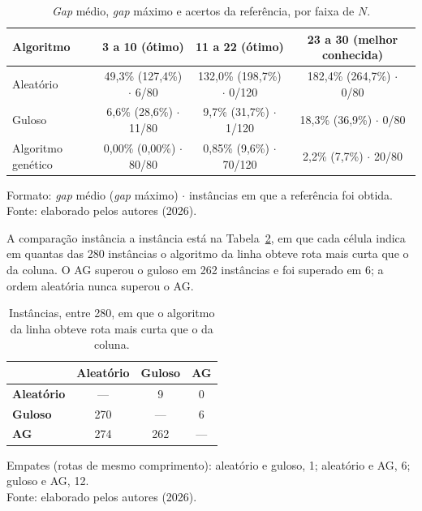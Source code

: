 \begin{table}[H]
    \centering
    \caption{\textit{Gap} médio, \textit{gap} máximo e acertos da referência, por faixa de $N$.}
    \label{tab:rotas_gap}
    \small
    \renewcommand{\arraystretch}{1.25}
    \setlength{\tabcolsep}{4pt}
    \begin{tabular}{lccc}
        \hline
        \textbf{Algoritmo} & \textbf{3 a 10 (ótimo)} & \textbf{11 a 22 (ótimo)} & \textbf{23 a 30 (melhor conhecida)} \\
        \hline
        Aleatório & 49,3\% (127,4\%) $\cdot$ 6/80 & 132,0\% (198,7\%) $\cdot$ 0/120 & 182,4\% (264,7\%) $\cdot$ 0/80 \\
        Guloso & 6,6\% (28,6\%) $\cdot$ 11/80 & 9,7\% (31,7\%) $\cdot$ 1/120 & 18,3\% (36,9\%) $\cdot$ 0/80 \\
        Algoritmo genético & 0,00\% (0,00\%) $\cdot$ 80/80 & 0,85\% (9,6\%) $\cdot$ 70/120 & 2,2\% (7,7\%) $\cdot$ 20/80 \\
        \hline
    \end{tabular}
    \par\vspace{0.15cm}
    \footnotesize Formato: \textit{gap} médio (\textit{gap} máximo) $\cdot$ instâncias em que a referência foi obtida.\\
    Fonte: elaborado pelos autores (2026).
\end{table}

A comparação instância a instância está na Tabela~\ref{tab:rotas_confronto}, em que cada célula indica em quantas das 280 instâncias o algoritmo da linha obteve rota mais curta que o da coluna. O AG superou o guloso em 262 instâncias e foi superado em 6; a ordem aleatória nunca superou o AG.

\begin{table}[H]
    \centering
    \caption{Instâncias, entre 280, em que o algoritmo da linha obteve rota mais curta que o da coluna.}
    \label{tab:rotas_confronto}
    \small
    \renewcommand{\arraystretch}{1.25}
    \begin{tabular}{lccc}
        \hline
        & \textbf{Aleatório} & \textbf{Guloso} & \textbf{AG} \\
        \hline
        \textbf{Aleatório} & --- & 9 & 0 \\
        \textbf{Guloso} & 270 & --- & 6 \\
        \textbf{AG} & 274 & 262 & --- \\
        \hline
    \end{tabular}
    \par\vspace{0.15cm}
    \footnotesize Empates (rotas de mesmo comprimento): aleatório e guloso, 1; aleatório e AG, 6; guloso e AG, 12.\\
    Fonte: elaborado pelos autores (2026).
\end{table}

